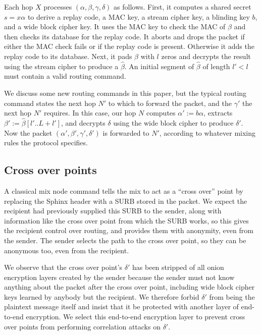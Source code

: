 Each hop $X$ processes $(\alpha,\beta,\gamma,\delta)$ as follows.  
First, it computes a shared secret $s = x \alpha$ to
derive a replay code, a MAC key, a stream cipher key, 
 a blinding key $b$, and a wide block cipher key. 
It uses the MAC key to check the MAC of $\beta$ and
 then checks its database for the replay code.
It aborts and drops the packet if either the MAC check fails or
 if the replay code is present.  Otherwise it adds the replay code
 to its database.
Next, it pads $\beta$ with $l$ zeros and decrypts the result
 using the stream cipher to produce a $\hat\beta$.
An initial segment of $\hat\beta$ of length $l' < l$ must contain
a valid routing command.  

We discuss some new routing commands in this paper, but the typical
routing command states the next hop $N'$ to which to forward the
packet, and the $\gamma'$ the next hop $N'$ requires. 
In this case, our hop $N$ computes $\alpha' := b \alpha$,
extracts $\beta' := \hat\beta[l'..L+l']$, and
decrypts $\delta$ using the wide block cipher to produce $\delta'$.
Now the packet $(\alpha',\beta',\gamma',\delta')$ is forwarded to $N'$,
 according to whatever mixing rules the protocol specifies.


\subsection{Cross over points}\label{subsec:crossover}


A classical mix node command tells the mix to act as a ``cross over''
point by replacing the Sphinx header with a SURB stored in the packet.
We expect the recipient had previously supplied this SURB to the
sender, along with information like the cross over point from which
the SURB works, so this gives the recipient control over routing, 
and provides them with anonymity, even from the sender.  
The sender selects the path to the cross over point, so they can be
anonymous too, even from the recipient.

\smallskip

We observe that the cross over point's $\delta'$ has been stripped of
all onion encryption layers created by the sender because the sender
must not know anything about the packet after the cross over point,
including wide block cipher keys learned by anybody but the recipient.
We therefore forbid $\delta'$ from being the plaintext message itself
and insist that it be protected with another layer of end-to-end
encryption.  We select this end-to-end encryption layer to prevent
cross over points from performing correlation attacks on $\delta'$.

